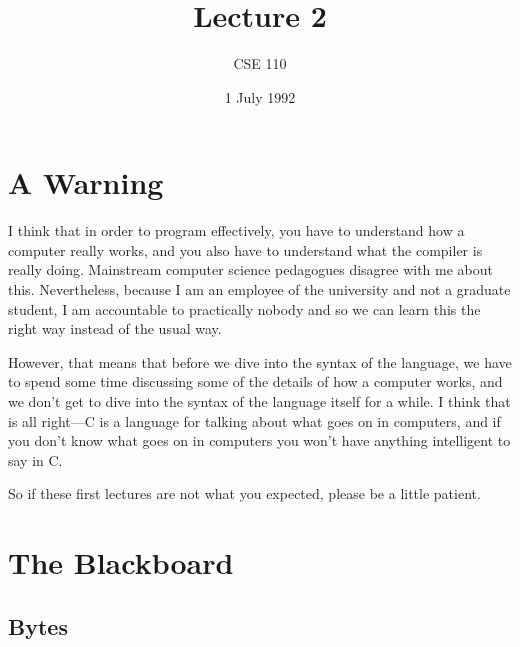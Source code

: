 

\def\baselinestretch{2}

\def\brac#1{$<$#1$>$}
\def\Int{{\tt int}}
\def\int{\brac{\Int}}
\def\int{\brac{\Int}}
\def\Shortint{{\tt short~int}}
\def\shortint{\brac{\Shortint}}
\def\Longint{{\tt long~int}}
\def\longint{\brac{\Longint}}
\def\Float{{\tt float}}
\def\float{\brac{\Float}}
\def\Double{{\tt double}}
\def\double{\brac{\Double}}
\def\Char{{\tt char}}
\def\char{\brac{\Char}}
\def\Void{{\tt void}}
\def\void{\brac{\Void}}

\def\p2#1{\brac{pointer~to #1}}

\parskip 8pt

\title{Lecture 2}
\author{CSE 110}
\date{1 July 1992}



\maketitle

\section{A Warning}

    I think that in order to program effectively, you have to understand
how a computer really works, and you also have to understand what the
compiler is really doing.  Mainstream computer science pedagogues
disagree with me about this.  Nevertheless, because I am an employee of
the university and not a graduate student, I am accountable to
practically nobody and so we can learn this the right way instead of the
usual way.

    However, that means that before we dive into the syntax of the
language, we have to spend some time discussing some of the details of
how a computer works, and we don't get to dive into the syntax of the
language itself for a while.  I think that is all right---C is a
language for talking about what goes on in computers, and if you don't
know what goes on in computers you won't have anything intelligent to
say in C.

    So if these first lectures are not what you expected, please be a
little patient.

\section{The Blackboard}

\subsection{Bytes}

